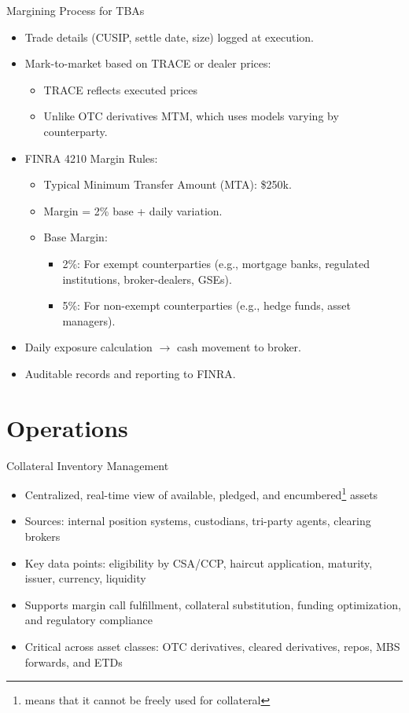 \documentclass[handout, aspectratio=169]{beamer}
\begin{document}
\begin{frame}{Margining Process for TBAs}
  \begin{itemize}
    \item Trade details (CUSIP, settle date, size) logged at execution.
    \item Mark-to-market based on TRACE or dealer prices:
    \begin{itemize}
      \item TRACE reflects executed prices
      \item Unlike OTC derivatives MTM, which uses models varying by counterparty.
    \end{itemize}
    \item FINRA 4210 Margin Rules:
    \begin{itemize}
      \item Typical Minimum Transfer Amount (MTA): \$250k.
      \item Margin = 2\% base + daily variation.
      \item Base Margin:
      \begin{itemize}
        \item 2\%: For exempt counterparties (e.g., mortgage banks, regulated institutions, broker-dealers, GSEs).
        \item 5\%: For non-exempt counterparties (e.g., hedge funds, asset managers).
      \end{itemize}
    \end{itemize}
    \item Daily exposure calculation $\rightarrow$ cash movement to broker.
    \item Auditable records and reporting to FINRA.
  \end{itemize}
\end{frame}
  
\section{Operations}
\begin{frame}{Collateral Inventory Management}
  \begin{itemize}
    \item Centralized, real-time view of available, pledged, and encumbered\footnote{means that it cannot be freely used for collateral} assets
    \item Sources: internal position systems, custodians, tri-party agents, clearing brokers
    \item Key data points: eligibility by CSA/CCP, haircut application, maturity, issuer, currency, liquidity
    \item Supports margin call fulfillment, collateral substitution, funding optimization, and regulatory compliance
    \item Critical across asset classes: OTC derivatives, cleared derivatives, repos, MBS forwards, and ETDs
  \end{itemize}
\end{frame}
\end{document}

